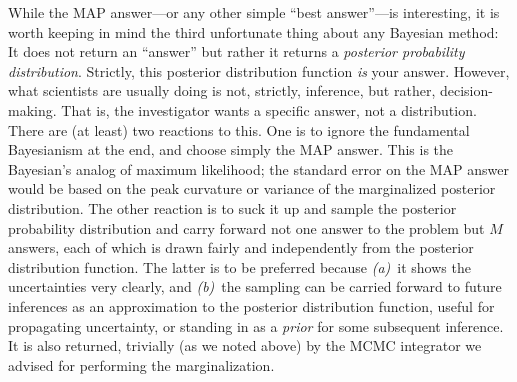 \documentclass[12pt,twoside]{article}
\newcounter{problem}
\begin{document}
While the MAP answer---or any other simple ``best answer''---is
interesting, it is worth keeping in mind the third unfortunate thing
about any Bayesian method: It does not return an ``answer'' but rather
it returns a \emph{posterior probability distribution}.  Strictly,
this posterior distribution function \emph{is} your answer.  However,
what scientists are usually doing is not, strictly, inference, but
rather, decision-making.  That is, the investigator wants a specific
answer, not a distribution.  There are (at least) two reactions to
this.  One is to ignore the fundamental Bayesianism at the end, and
choose simply the MAP answer.  This is the Bayesian's analog of
maximum likelihood; the standard error on the MAP answer would be
based on the peak curvature or variance of the marginalized posterior
distribution.  The other reaction is to suck it up and sample the
posterior probability distribution and carry forward not one answer to
the problem but $M$ answers, each of which is drawn fairly and
independently from the posterior distribution function.  The latter is
to be preferred because \textsl{(a)}~it shows the uncertainties very
clearly, and \textsl{(b)}~the sampling can be carried forward to
future inferences as an approximation to the posterior distribution
function, useful for propagating uncertainty, or standing in as a
\emph{prior} for some subsequent inference.  It is also returned,
trivially (as we noted above) by the MCMC integrator we advised for
performing the marginalization.
\end{document}
